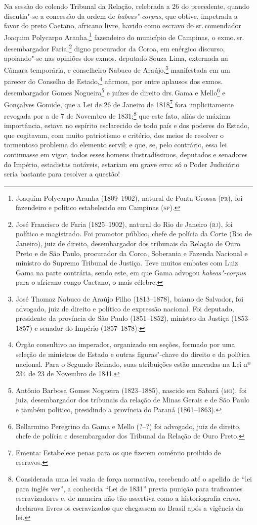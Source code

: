Na sessão do colendo Tribunal da Relação, celebrada a 26 do precedente,
quando discutia"-se a concessão da ordem de \emph{habeas"-corpus}, que
obtive, impetrada a favor do preto Caetano, africano livre, havido como
escravo do sr.\,comendador Joaquim Polycarpo Aranha,\footnote{Joaquim
  Polycarpo Aranha (1809--1902), natural de Ponta Grossa (\textsc{pr}), foi
  fazendeiro e político estabelecido em Campinas (\textsc{sp}).} fazendeiro do
município de Campinas, o exmo.\,sr.\,desembargador Faria,\footnote{José
  Francisco de Faria (1825--1902), natural do Rio de Janeiro (\textsc{rj}), foi
  político e magistrado. Foi promotor público, chefe de polícia da Corte
  (Rio de Janeiro), juiz de direito, desembargador dos tribunais da
  Relação de Ouro Preto e de São Paulo, procurador da Coroa, Soberania e
  Fazenda Nacional e ministro do Supremo Tribunal de Justiça. Teve
  muitos embates com Luiz Gama na parte contrária, sendo este, em que
  Gama advogou \emph{habeas"-corpus} para o africano congo Caetano, o
  mais célebre.} digno procurador da Coroa, em enérgico discurso,
apoiando"-se nas opiniões dos exmos. deputado Souza Lima, externada na
Câmara temporária, e conselheiro Nabuco de Araújo,\footnote{José
  Thomaz Nabuco de Araújo Filho (1813--1878), baiano de Salvador, foi
  advogado, juiz de direito e político de expressão nacional. Foi
  deputado, presidente da província de São Paulo (1851--1852), ministro
  da Justiça (1853--1857) e senador do Império (1857--1878).} manifestada
em um parecer do Conselho de Estado,\footnote{Órgão consultivo ao
  imperador, organizado em seções, formado por uma seleção de ministros
  de Estado e outras figuras"-chave do direito e da política nacional.
  Para o Segundo Reinado, suas atribuições estão marcadas na Lei nº 234
  de 23 de Novembro de 1841.} afirmou, por entre aplausos dos exmos.
desembargador Gomes Nogueira\footnote{Antônio Barbosa Gomes Nogueira
  (1823--1885), nascido em Sabará (\textsc{mg}), foi juiz, desembargador dos
  tribunais da relação de Minas Gerais e de São Paulo e também
  político, presidindo a província do Paraná (1861--1863).} e juízes de
direito drs.\,Gama e Mello\footnote{Bellarmino Peregrino da Gama e
  Mello (?--?) foi advogado, juiz de direito, chefe de polícia e
  desembargador dos Tribunal da Relação de Ouro Preto.} e Gonçalves
Gomide, que a Lei de 26 de Janeiro de 1818\footnote{Ementa: Estabelece
  penas para os que fizerem comércio proibido de escravos.} fora
implicitamente revogada por a de 7 de Novembro de 1831;\footnote{
  Considerada uma lei vazia de força normativa, recebendo até o apelido
  de ``lei para inglês ver'', a conhecida ``Lei de 1831'' previa punição
  para traficantes escravizadores e, de maneira não tão assertiva como a
  historiografia crava, declarava livres os escravizados que chegassem
  ao Brasil após a vigência da lei.} que este fato, aliás de máxima
importância, estava no espírito esclarecido de todo país e dos poderes
do Estado, que cogitavam, com muito patriotismo e critério, dos meios de
resolver o tormentoso problema do elemento servil; e que, se, pelo
contrário, essa lei continuasse em vigor, todos esses homens
ilustradíssimos, deputados e senadores do Império, estadistas notáveis,
estariam em grave erro: só o Poder Judiciário seria bastante para
resolver a questão!


